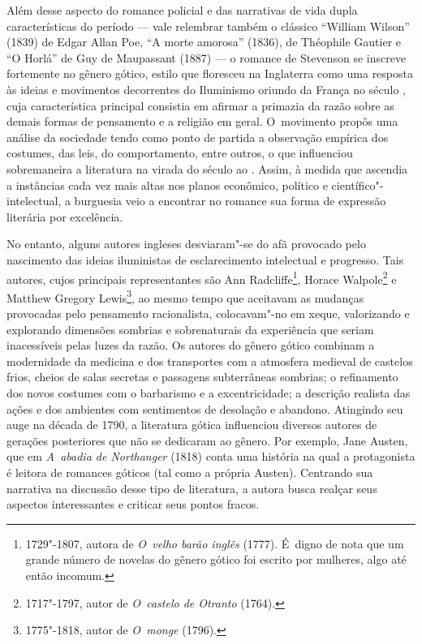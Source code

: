 Além desse aspecto do romance policial e das narrativas de vida dupla características do período --- vale relembrar também o clássico ``William Wilson'' (1839) de Edgar Allan Poe, ``A morte amorosa'' (1836), de Théophile Gautier e ``O Horlá'' de Guy de Maupassant (1887) --- o romance de Stevenson se inscreve fortemente no gênero gótico, estilo que floresceu na Inglaterra como uma resposta às ideias
e movimentos decorrentes do Iluminismo oriundo da França no século
, cuja característica principal consistia em afirmar a primazia da
razão sobre as demais formas de pensamento e a religião em geral. O~movimento propôs uma análise da sociedade tendo como ponto de partida a
observação empírica dos costumes, das leis, do comportamento, entre
outros, o que influenciou sobremaneira a literatura na virada do século
 ao . Assim, à medida que ascendia a instâncias cada vez mais altas nos planos econômico, político e científico"-intelectual, a
burguesia veio a encontrar no romance sua forma de expressão literária
por excelência.

No entanto, alguns autores ingleses desviaram"-se do afã provocado pelo
nascimento das ideias iluministas de esclarecimento intelectual e
progresso. Tais autores, cujos principais representantes são Ann
Radcliffe\footnote{1729"-1807, autora de \emph{O~velho barão
inglês} (1777). É~digno de nota que um grande número de novelas do
gênero gótico foi escrito por mulheres, algo até então incomum.},
Horace Walpole\footnote{1717"-1797, autor de \emph{O~castelo de
Otranto} (1764).}
 e Matthew Gregory
 Lewis\footnote{1775"-1818, autor de \emph{O~monge} (1796).}, 
ao mesmo tempo que aceitavam as mudanças
provocadas pelo pensamento racionalista, colocavam"-no em xeque,
valorizando e explorando dimensões sombrias e sobrenaturais da
experiência que seriam inacessíveis pelas luzes da razão. Os autores
do gênero gótico combinam a modernidade da medicina e dos transportes
com a atmosfera medieval de castelos frios, cheios de salas secretas e
passagens subterrâneas sombrias; o refinamento dos novos costumes com o
barbarismo e a excentricidade; a descrição realista das ações e dos
ambientes com sentimentos de desolação e abandono. Atingindo seu auge na
década de 1790, a literatura gótica influenciou
diversos autores de gerações posteriores que não se dedicaram ao gênero.
Por exemplo, Jane Austen, que em \emph{A~abadia de Northanger} (1818)
conta uma história na qual a protagonista é leitora de romances góticos
(tal como a própria Austen). Centrando sua narrativa na discussão desse
tipo de literatura, a autora busca realçar seus aspectos interessantes e
criticar seus pontos fracos.


